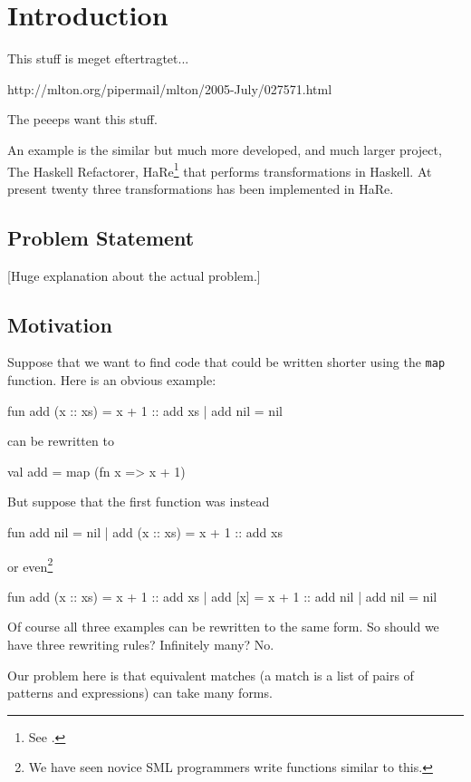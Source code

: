\chapter{Introduction}

This stuff is meget eftertragtet...

http://mlton.org/pipermail/mlton/2005-July/027571.html 

The peeeps want this stuff.

An example is the similar but much more developed, and much larger project, The
Haskell Refactorer, HaRe\footnote{See \cite{HARE}.} that performs
transformations in Haskell. At present twenty three transformations has been
implemented in HaRe.



\section{Problem Statement}

{\footnotesize [Huge explanation about the actual problem.]}


\section{Motivation}
\label{sec:motivation}
Suppose that we want to find code that could be written shorter using the
\texttt{map} function.
Here is an obvious example:
\begin{sml}
fun add (x :: xs) = x + 1 :: add xs
  | add nil       = nil
\end{sml}
can be rewritten to
\begin{sml}
val add = map (fn x => x + 1)
\end{sml}

But suppose that the first function was instead
\begin{sml}
fun add nil       = nil
  | add (x :: xs) = x + 1 :: add xs
\end{sml}
or even\footnote{We have seen novice SML programmers write functions similar to
  this.}
\begin{sml}
fun add (x :: xs) = x + 1 :: add xs
  | add [x]       = x + 1 :: add nil
  | add nil       = nil
\end{sml}
Of course all three examples can be rewritten to the same form. So should we
have three rewriting rules? Infinitely many? No.

Our problem here is that equivalent matches (a match is a list of pairs of
patterns and expressions) can take many forms.

